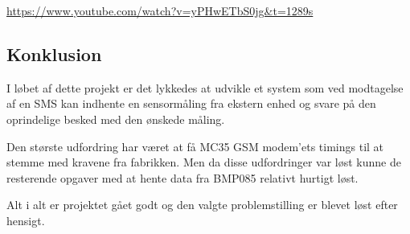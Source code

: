 \vskip 0.5cm
	\begin{center}
		\url{https://www.youtube.com/watch?v=yPHwETbS0jg&t=1289s}
	\end{center}
\vskip 0.5cm

\subsection{Konklusion}

I løbet af dette projekt er det lykkedes at udvikle et system som ved modtagelse af en SMS kan indhente en sensormåling fra ekstern enhed og svare på den oprindelige besked med den ønskede måling. 

Den største udfordring har været at få MC35 GSM modem'ets timings til at stemme med kravene fra fabrikken. Men da disse udfordringer var løst kunne de resterende opgaver med at hente data fra BMP085 relativt hurtigt løst.

Alt i alt er projektet gået godt og den valgte problemstilling er blevet løst efter hensigt. 